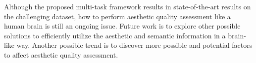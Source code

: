 \documentclass[journal]{IEEEtran}
\begin{document}
Although the proposed multi-task framework results in state-of-the-art results on the challenging dataset, how to perform aesthetic quality assessment like a human brain is still an ongoing issue. Future work is to explore other possible solutions to efficiently utilize the aesthetic and semantic information in a brain-like way. Another possible trend is to discover more possible and potential factors to affect aesthetic quality assessment.



\ifCLASSOPTIONcaptionsoff
  \newpage
\fi







\end{document}
